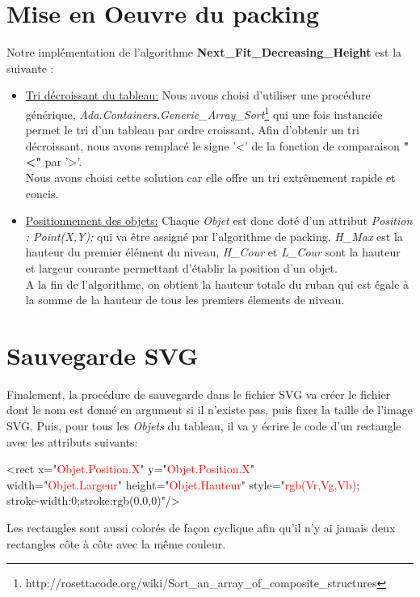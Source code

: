 \documentclass{article}
\begin{document}
\section {Mise en Oeuvre du packing}
Notre implémentation de l'algorithme \textbf{Next\_Fit\_Decreasing\_Height} est la suivante :
\begin{itemize}
  \item \underline{Tri décroissant du tableau:} Nous avons choisi d'utiliser une procédure générique, \textit{Ada.Containers.Generic\_Array\_Sort}\footnote{http://rosettacode.org/wiki/Sort\_an\_array\_of\_composite\_structures} qui une fois instanciée permet le tri d'un tableau par ordre croissant. Afin d'obtenir un tri décroissant, nous avons remplacé le signe '<' de la fonction de comparaison \textbf{"<"} par '>'.\\
\noindent Nous avons choisi cette solution car elle offre un tri extrêmement rapide et concis.
  \item \underline{Positionnement des objets:} Chaque \textit{Objet} est donc doté d'un attribut \emph{Position : Point(X,Y);} qui va être assigné par l'algorithme de packing. \textit{H\_Max} est la hauteur du premier élément du niveau, \textit{H\_Cour} et \textit{L\_Cour} sont la hauteur et largeur courante permettant d'établir la position d'un objet. \\
A la fin de l'algorithme, on obtient la hauteur totale du ruban qui est égale à la somme de la hauteur de tous les premiers élements de niveau.
\end{itemize}

\section {Sauvegarde SVG}
Finalement, la procédure de sauvegarde dans le fichier SVG va créer le fichier dont le nom est donné en argument si il n'existe pas, puis fixer la taille de l'image SVG. Puis, pour tous les \textit{Objets} du tableau, il va y écrire le code d'un rectangle avec les attributs suivants:

\begin{framed}
\small \noindent
<rect x="\textcolor{red}{Objet.Position.X}" y="\textcolor{red}{Objet.Position.X}" \\
width="\textcolor{red}{Objet.Largeur}" height="\textcolor{red}{Objet.Hauteur}" 
        style="\textcolor{red}{rgb(Vr,Vg,Vb)};\\
        stroke-width:0;stroke:rgb(0,0,0)"/>
\end{framed}

Les rectangles sont aussi colorés de façon cyclique afin qu'il n'y ai jamais deux rectangles côte à côte avec la même couleur.
\end{document}

